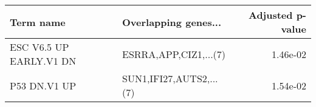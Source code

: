 \begin{tabular}{llr}
\toprule
              Term name &    Overlapping genes... &  Adjusted p-value \\
\midrule
ESC V6.5 UP EARLY.V1 DN &   ESRRA,APP,CIZ1,...(7) &          1.46e-02 \\
           P53 DN.V1 UP & SUN1,IFI27,AUTS2,...(7) &          1.54e-02 \\
\bottomrule
\end{tabular}
